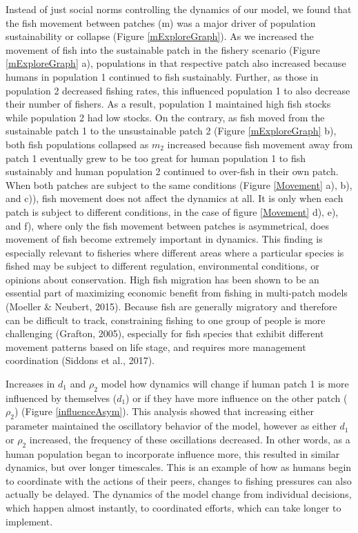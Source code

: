\documentclass[
  12pt,
]{article}
\begin{document}
Instead of just social norms controlling the dynamics of our model, we found that the fish movement between patches (m) was a major driver of population sustainability or collapse (Figure \ref{mExploreGraph}). As we increased the movement of fish into the sustainable patch in the fishery scenario (Figure \ref{mExploreGraph} a), populations in that respective patch also increased because humans in population 1 continued to fish sustainably. Further, as those in population 2 decreased fishing rates, this influenced population 1 to also decrease their number of fishers. As a result, population 1 maintained high fish stocks while population 2 had low stocks. On the contrary, as fish moved from the sustainable patch 1 to the unsustainable patch 2 (Figure \ref{mExploreGraph} b), both fish populations collapsed as \(m_2\) increased because fish movement away from patch 1 eventually grew to be too great for human population 1 to fish sustainably and human population 2 continued to over-fish in their own patch. When both patches are subject to the same conditions (Figure \ref{Movement} a), b), and c)), fish movement does not affect the dynamics at all. It is only when each patch is subject to different conditions, in the case of figure \ref{Movement} d), e), and f), where only the fish movement between patches is asymmetrical, does movement of fish become extremely important in dynamics. This finding is especially relevant to fisheries where different areas where a particular species is fished may be subject to different regulation, environmental conditions, or opinions about conservation. High fish migration has been shown to be an essential part of maximizing economic benefit from fishing in multi-patch models (Moeller \& Neubert, 2015). Because fish are generally migratory and therefore can be difficult to track, constraining fishing to one group of people is more challenging (Grafton, 2005), especially for fish species that exhibit different movement patterns based on life stage, and requires more management coordination (Siddons et al., 2017).

Increases in \(d_1\) and \(\rho_2\) model how dynamics will change if human patch 1 is more influenced by themselves (\(d_1\)) or if they have more influence on the other patch (\(\rho_2\)) (Figure \ref{influenceAsym}). This analysis showed that increasing either parameter maintained the oscillatory behavior of the model, however as either \(d_1\) or \(\rho_2\) increased, the frequency of these oscillations decreased. In other words, as a human population began to incorporate influence more, this resulted in similar dynamics, but over longer timescales. This is an example of how as humans begin to coordinate with the actions of their peers, changes to fishing pressures can also actually be delayed. The dynamics of the model change from individual decisions, which happen almost instantly, to coordinated efforts, which can take longer to implement.
\end{document}
